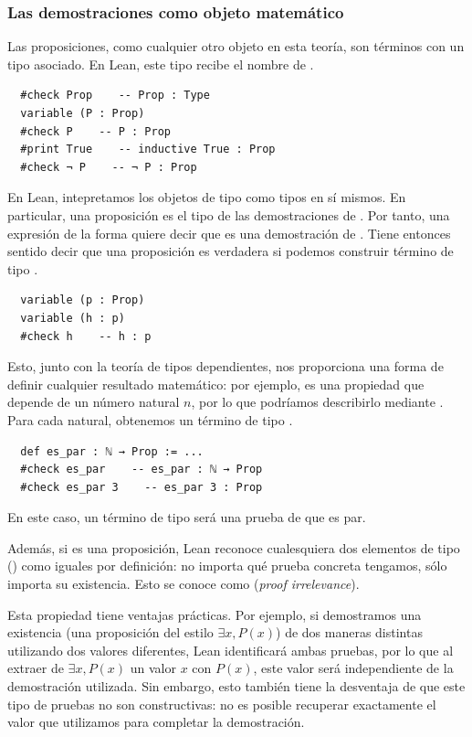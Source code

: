 \subsubsection{Las demostraciones como objeto matemático}

Las proposiciones, como cualquier otro objeto en esta teoría, son términos con un tipo asociado. En Lean, este tipo recibe el nombre de .

\begin{lstlisting}
  #check Prop    -- Prop : Type
  variable (P : Prop)
  #check P    -- P : Prop
  #print True    -- inductive True : Prop
  #check ¬ P    -- ¬ P : Prop
\end{lstlisting}

En Lean, intepretamos los objetos de tipo  como tipos en sí mismos. En particular, una proposición  es el tipo de las demostraciones de . Por tanto, una expresión de la forma  quiere decir que  es una demostración de . Tiene entonces sentido decir que una proposición  es verdadera si podemos construir término de tipo .

\begin{lstlisting}
  variable (p : Prop)
  variable (h : p)
  #check h    -- h : p
\end{lstlisting}

Esto, junto con la teoría de tipos dependientes, nos proporciona una forma de definir cualquier resultado matemático: por ejemplo,  es una propiedad que depende de un número natural $n$, por lo que podríamos describirlo mediante . Para cada  natural, obtenemos un término de tipo .

\begin{lstlisting}
  def es_par : ℕ → Prop := ...
  #check es_par    -- es_par : ℕ → Prop
  #check es_par 3    -- es_par 3 : Prop
\end{lstlisting}

En este caso, un término de tipo  será una prueba de que  es par.

Además, si  es una proposición, Lean reconoce cualesquiera dos elementos de tipo  () como iguales por definición: no importa qué prueba concreta tengamos, sólo importa su existencia. Esto se conoce como  (\textit{proof irrelevance}).

Esta propiedad tiene ventajas prácticas. Por ejemplo, si demostramos una existencia (una proposición del estilo $\exists x, P(x)$) de dos maneras distintas utilizando dos valores diferentes, Lean identificará ambas pruebas, por lo que al extraer de $\exists x, P(x)$ un valor $x$ con $P(x)$, este valor será independiente de la demostración utilizada. Sin embargo, esto también tiene la desventaja de que este tipo de pruebas no son constructivas: no es posible recuperar exactamente el valor que utilizamos para completar la demostración.


